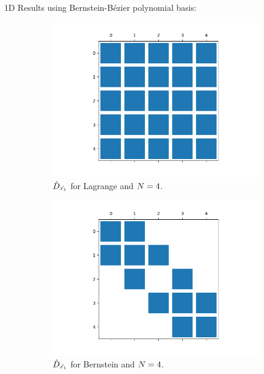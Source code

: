 \begin{frame}{1D Results using Bernstein-Bézier polynomial basis:}

\begin{figure}[htbp]
\begin{subfigure}{0.45\textwidth}
\centering
\includegraphics[scale=0.2]{image/dx_lag_4.png}
\caption*{${{\hat{D}}_{\hat{x_1}}}$ for Lagrange and ${N}=4$.}
\end{subfigure}
\begin{subfigure}{0.45\textwidth}
\centering
\includegraphics[scale=0.2]{image/dx_bb_4.png}
\caption*{${{\hat{D}}_{\hat{x_1}}}$ for Bernstein and ${N}=4$.}
\end{subfigure}
\begin{subfigure}{0.45\textwidth}

\end{subfigure}
\end{figure}
\end{frame}
